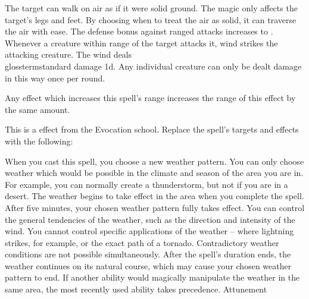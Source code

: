 The target can walk on air as if it were solid ground.
The magic only affects the target's legs and feet.
By choosing when to treat the air as solid, it can traverse the air with ease.
The defense bonus against ranged attacks increases to .
Whenever a creature within \rngclose range of the target attacks it, wind strikes the attacking creature.
The wind deals \\glossterm{standard damage} \minus1d.
Any individual creature can only be dealt damage in this way once per round.
\par Any effect which increases this spell's range increases the range of this effect by the same amount.
\par
This is a  effect from the Evocation school.
Replace the spell's targets and effects with the following:
\begin{spellcontent}
\begin{augmenttargetinginfo}
\end{augmenttargetinginfo}
\begin{augmenteffects}
\spelleffect
When you cast this spell, you choose a new weather pattern.
You can only choose weather which would be possible in the climate and season of the area you are in.
For example, you can normally create a thunderstorm, but not if you are in a desert.
The weather begins to take effect in the area when you complete the spell.
After five minutes, your chosen weather pattern fully takes effect.
You can control the general tendencies of the weather, such as the direction and intensity of the wind.
You cannot control specific applications of the weather -- where lightning strikes, for example, or the exact path of a tornado.
Contradictory weather conditions are not possible simultaneously.
After the spell's duration ends, the weather continues on its natural course, which may cause your chosen weather pattern to end.
If another ability would magically manipulate the weather in the same area, the most recently used ability takes precedence.
\spelldur Attunement
\end{augmenteffects}
\end{spellcontent}
